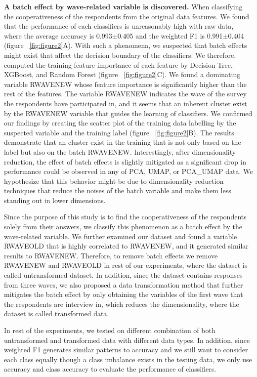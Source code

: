 \textbf{A batch effect by wave-related variable is discovered.} When classifying the cooperativeness of the respondents from the original data features. We found that the performance of each classifiers is unreasonably high with raw data, where the average accuracy is 0.993$\pm$0.405 and the weighted F1 is 0.991$\pm$0.404 (figure ~\ref{fig:figure2}A). With such a phenomena, we suspected that batch effects might exist that affect the decision boundary of the classifiers. We therefore, computed the training feature importance of each feature by Decision Tree, XGBoost, and Random Forest (figure ~\ref{fig:figure2}C). We found a dominating variable RWAVENEW whose feature importance is significantly higher than the rest of the features. The variable RWAVENEW indicates the wave of the survey the respondents have participated in, and it seems that an inherent cluster exist by the RWAVENEW variable that guides the learning of classifiers. We confirmed our findings by creating the scatter plot of the training data labelling by the suspected variable and the training label (figure ~\ref{fig:figure2}B). The results demonstrate that an cluster exist in the training that is not only based on the label but also on the batch RWAVENEW. Interestingly, after dimensionality reduction, the effect of batch effects is slightly mitigated as a significant drop in performance could be observed in any of PCA, UMAP, or PCA\_UMAP data. We hypothesize that this behavior might be due to dimensionality reduction techniques that reduce the noises of the batch variable and make them less standing out in lower dimensions.

Since the purpose of this study is to find the cooperativeness of the respondents solely from their answers, we classify this phenomenon as a batch effect by the wave-related variable. We further examined our dataset and found a variable RWAVEOLD that is highly correlated to RWAVENEW, and it generated similar results to RWAVENEW. Therefore, to remove batch effects we remove RWAVENEW and RWAVEOLD in rest of our experiments, where the dataset is called untransformed dataset. In addition, since the dataset contains responses from three waves, we also proposed a data transformation method that further mitigates the batch effect by only obtaining the variables of the first wave that the respondents are interview in, which reduces the dimensionality, where the dataset is called transformed data. 

In rest of the experiments, we tested on different combination of both untransformed and transformed data with different data types. In addition, since weighted F1 generates similar patterns to accuracy and we still want to consider each class equally though a class imbalance exists in the testing data, we only use accuracy and class accuracy to evaluate the performance of classifiers.

